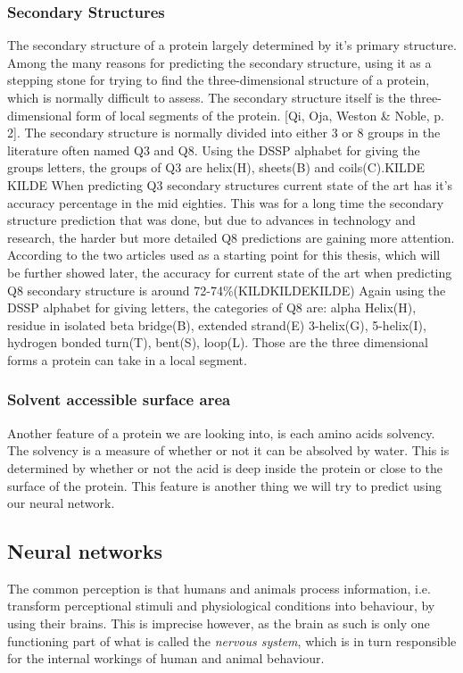 \subsubsection{Secondary Structures}
The secondary structure of a protein largely determined by it's primary structure. Among the many reasons for predicting the secondary structure, using it as a stepping stone for trying to find the three-dimensional structure of a protein, which is normally difficult to assess. The secondary structure itself is the three-dimensional form of local segments of the protein. [Qi, Oja, Weston \& Noble, p. 2].
The secondary structure is normally divided into either 3 or 8 groups in the literature often named Q3 and Q8. Using the DSSP alphabet for giving the groups letters, the groups of Q3 are helix(H), sheets(B) and coils(C).KILDE KILDE
When predicting Q3 secondary structures current state of the art has it's accuracy percentage in the mid eighties. This was for a long time the secondary structure prediction that was done, but due to advances in technology and research, the harder but more detailed Q8 predictions are gaining more attention. According to the two articles used as a starting point for this thesis, which will be further showed later, the accuracy for current state of the art when predicting Q8 secondary structure is around 72-74\%(KILDKILDEKILDE)
Again using the DSSP alphabet for giving letters, the categories of Q8 are: alpha Helix(H), residue in isolated beta bridge(B), extended strand(E) 3-helix(G), 5-helix(I), hydrogen bonded turn(T), bent(S), loop(L). Those are the three dimensional forms a protein can take in a local segment.  


\subsubsection{Solvent accessible surface area}
Another feature of a protein we are looking into, is each amino acids solvency. The solvency is a measure of whether or not it can be absolved by water. This is determined by whether or not the acid is deep inside the protein or close to the surface of the protein. This feature is another thing we will try to predict using our neural network. 

\subsection{Neural networks}
The common perception is that humans and animals process information, i.e. transform perceptional 
stimuli and physiological conditions into behaviour, by using their brains. This is imprecise 
however, as the brain as such is only one functioning part of what is called the \textit{nervous 
system}, which is in turn responsible for the internal workings of human and animal behaviour.

